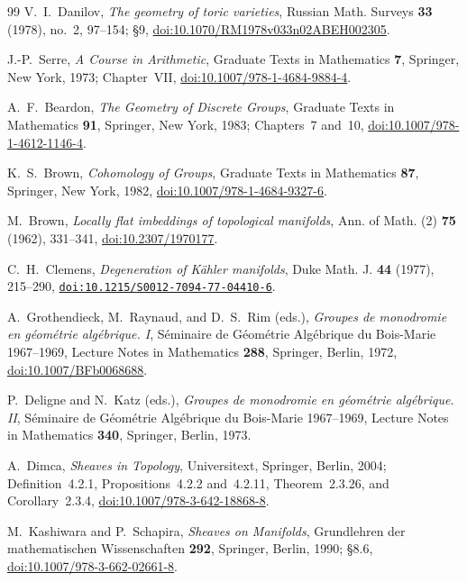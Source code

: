 \begin{thebibliography}{99}
V.~I.~Danilov,
\emph{The geometry of toric varieties},
Russian Math. Surveys \textbf{33} (1978), no.~2, 97--154; \S9,
\href{https://doi.org/10.1070/RM1978v033n02ABEH002305}{doi:10.1070/RM1978v033n02ABEH002305}.

J.-P.~Serre,
\emph{A Course in Arithmetic},
Graduate Texts in Mathematics \textbf{7}, Springer, New York, 1973;
Chapter~VII,
\href{https://doi.org/10.1007/978-1-4684-9884-4}{doi:10.1007/978-1-4684-9884-4}.

A.~F.~Beardon,
\emph{The Geometry of Discrete Groups},
Graduate Texts in Mathematics \textbf{91}, Springer, New York, 1983;
Chapters~7 and~10,
\href{https://doi.org/10.1007/978-1-4612-1146-4}{doi:10.1007/978-1-4612-1146-4}.

K.~S.~Brown,
\emph{Cohomology of Groups},
Graduate Texts in Mathematics \textbf{87}, Springer, New York, 1982,
\href{https://doi.org/10.1007/978-1-4684-9327-6}%
{doi:10.1007/978-1-4684-9327-6}.

M.~Brown,
\emph{Locally flat imbeddings of topological manifolds},
Ann. of Math. (2) \textbf{75} (1962), 331--341,
\href{https://doi.org/10.2307/1970177}{doi:10.2307/1970177}.

C.~H.~Clemens,
\emph{Degeneration of K\"ahler manifolds},
Duke Math. J. \textbf{44} (1977), 215--290,
\href{https://doi.org/10.1215/S0012-7094-77-04410-6}%
{\nolinkurl{doi:10.1215/S0012-7094-77-04410-6}}.

A.~Grothendieck, M.~Raynaud, and D.~S.~Rim (eds.),
\emph{Groupes de monodromie en g\'eom\'etrie alg\'ebrique. I},
S\'eminaire de G\'eom\'etrie Alg\'ebrique du Bois-Marie 1967--1969,
Lecture Notes in Mathematics \textbf{288}, Springer, Berlin, 1972,
\href{https://doi.org/10.1007/BFb0068688}{doi:10.1007/BFb0068688}.

P.~Deligne and N.~Katz (eds.),
\emph{Groupes de monodromie en g\'eom\'etrie alg\'ebrique. II},
S\'eminaire de G\'eom\'etrie Alg\'ebrique du Bois-Marie 1967--1969,
Lecture Notes in Mathematics \textbf{340}, Springer, Berlin, 1973.

A.~Dimca,
\emph{Sheaves in Topology},
Universitext, Springer, Berlin, 2004; Definition~4.2.1,
Propositions~4.2.2 and~4.2.11, Theorem~2.3.26, and Corollary~2.3.4,
\href{https://doi.org/10.1007/978-3-642-18868-8}{doi:10.1007/978-3-642-18868-8}.

M.~Kashiwara and P.~Schapira,
\emph{Sheaves on Manifolds},
Grundlehren der mathematischen Wissenschaften \textbf{292}, Springer,
Berlin, 1990; \S8.6,
\href{https://doi.org/10.1007/978-3-662-02661-8}{doi:10.1007/978-3-662-02661-8}.


\end{thebibliography}
